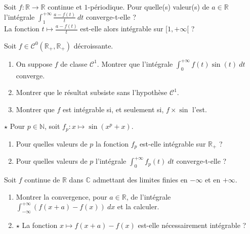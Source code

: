 \documentclass[french,a4paper]{article}
\newcommand{\N}{\mathbb{N}}
\newcommand{\R}{\mathbb{R}}
\newcommand{\C}{\mathbb{C}}
\theoremstyle{plain}
\theoremstyle{definition}
\theoremstyle{remark}
\begin{document}
\begin{ex}[Moulin.IG.50]{}
	Soit $f:\R\to\R$ continue et $1$-périodique. Pour quelle(s) valeur(s) de $a\in\R$ l'intégrale $\displaystyle\int_{1}^{+\infty}\frac{a-f(t)}{t}\ dt$ converge-t-elle ? \\
	La fonction $t\mapsto\displaystyle\frac{a-f(t)}{t}$ est-elle alors intégrable sur $[1,+\infty[$ ?
\end{ex}

\begin{ex}[Moulin.IG.51]{}
	Soit $f\in\mathcal{C}^0(\R_+,\R_+)$ décroissante.
	\begin{enumerate}
		\item On suppose $f$ de classe $\mathcal{C}^1$. Montrer que l'intégrale $\displaystyle\int_{0}^{+\infty}f(t)\sin(t)\ dt$ converge.
		\item Montrer que le résultat subsiste sans l'hypothèse $\mathcal{C}^1$.
		\item Montrer que $f$ est intégrable si, et seulement si, $f\times\sin$ l'est.
	\end{enumerate}
\end{ex}

\begin{ex}[Moulin.IG.52]{$\star$}
	Pour $p\in\N$, soit $f_p:x\mapsto\sin(x^p+x)$.
	\begin{enumerate}
		\item Pour quelles valeurs de $p$ la fonction $f_p$ est-elle intégrable sur $\R_+$ ?
		\item Pour quelles valeurs de $p$ l'intégrale $\displaystyle\int_{0}^{+\infty}f_p(t)\ dt$ converge-t-elle ?
	\end{enumerate}
\end{ex}

\begin{ex}[Moulin.IG.53]{}
	Soit $f$ continue de $\R$ dans $\C$ admettant des limites finies en $-\infty$ et en $+\infty$.
	\begin{enumerate}
		\item Montrer la convergence, pour $a\in\R$, de l'intégrale $\displaystyle\int_{-\infty}^{+\infty}(f(x+a)-f(x))\ dx$ et la calculer.
		\item $\star$ La fonction $x\mapsto f(x+a)-f(x)$ est-elle nécessairement intégrable ?
	\end{enumerate}
\end{ex}
\end{document}
